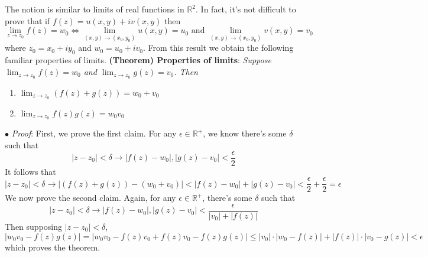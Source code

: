 \documentclass{article}
\newcommand*{\tb}{\textbf}
\newcommand*{\ti}{\textit}
\newcommand*{\nn}{\newline \newline}
\newcommand*{\Pf}{\indent \ensuremath{\bullet} \textit{Proof}: }
\newcommand*{\R}{\mathbb{R}}
\begin{document}
The notion is similar to limits of real functions in $ \R^2 $. In fact, it's not difficult to prove that if $ f(z) = u(x, y) + i v(x, y) $ then
$$ \lim_{z \to z_0} f(z) = w_0 \iff \lim_{(x, y) \to (x_0, y_0)} u(x, y) = u_0 \text{ and } \lim_{(x, y) \to (x_0, y_0)} v(x, y) = v_0 $$
where $ z_0 = x_0 + i y_0 $ and $ w_0 = u_0 + i v_0 $. From this result we obtain the following familiar properties of limits.
\nn
\tb{(Theorem) Properties of limits}: \ti{Suppose $ \lim_{z \to z_0} f(z) = w_0 $ and $ \lim_{z \to z_0} g(z) = v_0 $. Then}
\begin{enumerate}
    \item $ \lim_{z \to z_0} (f(z) + g(z)) = w_0 + v_0 $
    \item $ \lim_{z \to z_0} f(z) g(z) = w_0 v_0 $
\end{enumerate}
\Pf First, we prove the first claim. For any $ \epsilon \in \R^+ $, we know there's some $ \delta $ such that
$$ | z - z_0 | < \delta \rightarrow | f(z) - w_0 |, | g(z) - v_0 | < \frac{\epsilon}{2}$$
It follows that
$$ | z - z_0| < \delta \rightarrow | (f(z) + g(z)) - (w_0 + v_0) | < | f(z) - w_0 | + | g(z) - v_0 | < \frac{\epsilon}{2} + \frac{\epsilon}{2} = \epsilon $$
We now prove the second claim. Again, for any $ \epsilon \in \R^+ $, there's some $ \delta $ such that
$$ | z - z_0 | < \delta \rightarrow | f(z) - w_0 |, | g(z) - v_0 | < \frac{\epsilon}{| v_0 | + | f(z) |}$$
Then supposing $ | z - z_0 | < \delta $,
$$ | w_0 v_0 - f(z) g(z) | = | w_0 v_0 - f(z) v_0 + f(z) v_0 - f(z) g(z) | \leq | v_0 | \cdot | w_0 - f(z) | + | f(z) | \cdot | v_0 - g(z) | < \epsilon $$
which proves the theorem. \qedsymbol
\end{document}
